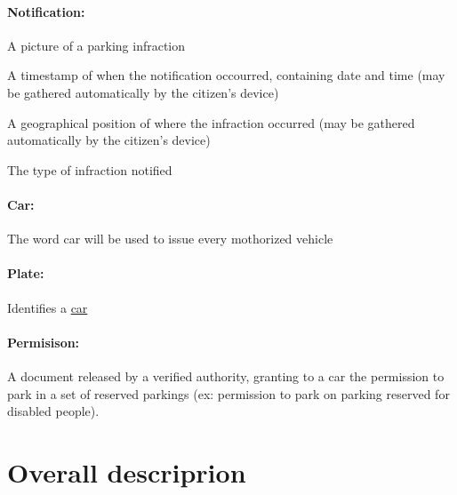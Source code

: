 \documentclass{article}
\begin{document}
		\paragraph{Notification:} 
			\begin{list}{-}{Represents a set of data submitted by any user composed by:}
				\item A picture of a parking infraction
				\item A timestamp of when the notification occourred, containing date and time (may be gathered automatically by the citizen's device)
				\item A geographical position of where the infraction occurred (may be gathered automatically by the citizen's device)
				\item The type of infraction notified
			\end{list}
		\paragraph{Car:}The word car will be used to issue every mothorized vehicle
		\paragraph{Plate:}Identifies a \underline{car}
		\paragraph{Permisison:}A document released by a verified authority, granting to a car the permission to park in a set of reserved parkings (ex: permission to park on parking reserved for disabled people). 
		

\section{Overall descriprion}
\end{document}
